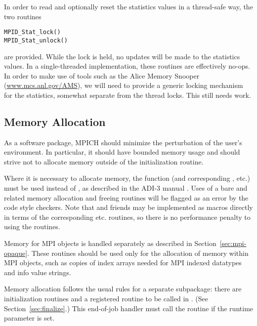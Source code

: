 \documentclass{article}
\begin{document}
In order to read and optionally reset the statistics values in a thread-safe
way, the two routines
\begin{verbatim}
MPID_Stat_lock()
MPID_Stat_unlock()
\end{verbatim}
are provided.  While the lock is held, no updates will be made to the
statistics values.  In a single-threaded implementation, these routines are
effectively no-ops.  
In order to make use of tools such as the Alice Memory Snooper
(\url{www.mcs.anl.gov/AMS}), we will need to provide a generic locking
mechanism for the statistics, somewhat separate from the thread locks.  This
still needs work.

\subsection{Memory Allocation}
As a software package, MPICH should minimize the perturbation of the user's
environment.  In 
particular, it should have bounded memory usage and should strive not to
allocate memory outside of the initialization routine.  

Where it is necessary to allocate memory, the function 
(and corresponding , etc.) must be used instead of
, as described in the ADI-3 manual \cite{adi3man}.  Uses of a
bare  and related memory allocation and freeing routines will be
flagged as an error by the code style checkers.  Note that 
and friends may be implemented as macros directly in terms of the
corresponding  etc. routines, so there is no performance penalty
to using the  routines.

Memory for MPI objects is handled separately as described in
Section~\ref{sec:mpi-opaque}.  These routines should be used only for
the allocation of memory within MPI objects, such as copies of index
arrays needed for MPI indexed datatypes and info value strings.

Memory allocation follows the usual rules for a separate subpackage: there are
initialization routines and a registered routine to be called in
. (See Section~\ref{sec:finalize}.)  This end-of-job
handler must call the 
routine  if the runtime parameter
 is set.  

\end{document}
